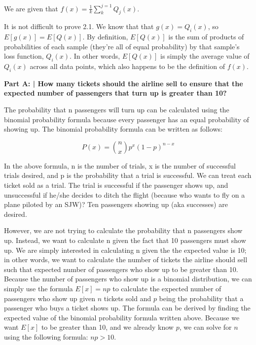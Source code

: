 \documentclass{article}
\begin{document}
 We are given that $f(x)=\frac{1}{k}\sum^{j=1}_{k}Q_j(x)$.
 
 It is not difficult to prove 2.1. We know that that $g(x)=Q_i(x)$, so $E[g(x)]=E[Q(x)]$. By definition, $E[Q(x)]$ is the sum of products of probabilities of each sample (they're all of equal probability) by that sample's loss function, $Q_i(x)$. In other words, $E[Q(x)]$ is simply the average value of $Q_i(x)$ across all data points, which also happens to be the definition of $f(x)$.
 
 \textbf{Part A: | How many tickets should the airline sell to ensure that the expected number of passengers that turn up is greater than 10?}\newline
 
 The probability that n passengers will turn up can be calculated using the binomial probability formula because every passenger has an equal probability of showing up. The binomial probability formula can be written as follows:
 
 \begin{displaymath}
    P(x)={n \choose x}p^x(1-p)^{n-x}
 \end{displaymath}
 
 In the above formula, n is the number of trials, x is the number of successful trials desired, and p is the probability that a trial is successful. We can treat each ticket sold as a trial. The trial is successful if the passenger shows up, and unsuccessful if he/she decides to ditch the flight (because who wants to fly on a plane piloted by an SJW)? Ten passengers showing up (aka successes) are desired.
 
 However, we are not trying to calculate the probability that n passengers show up. Instead, we want to calculate n given the fact that 10 passengers must show up. We are simply interested in calculating n given the the expected value is 10; in other words, we want to calculate the number of tickets the airline should sell such that expected number of passengers who show up to be greater than 10. Because the number of passengers who show up is a binomial distribution, we can simply use the formula $E[x]=np$ to calculate the expected number of passengers who show up given $n$ tickets sold and $p$ being the probability that a passenger who buys a ticket shows up. The formula can be derived by finding the expected value of the binomial probability formula written above. Because we want $E[x]$ to be greater than 10, and we already know $p$, we can solve for $n$ using the following formula: $np>10$.
 
\end{document}
